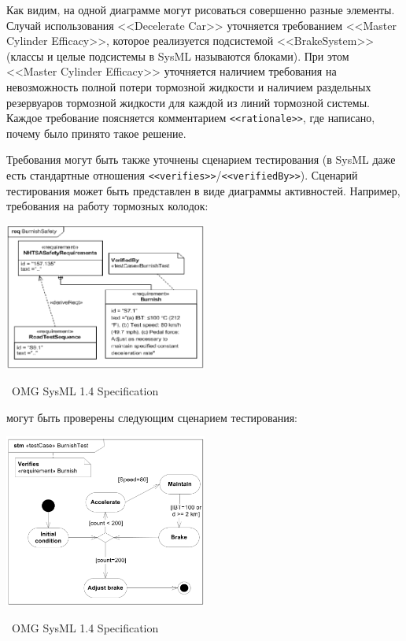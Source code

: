 \documentclass[a5paper]{article}
\newcommand{\attribution}[1] {
    \vspace{-4mm}\begin{flushright}\begin{scriptsize}%
    {\textcopyright\, #1}\end{scriptsize}\end{flushright}
}
\begin{document}
Как видим, на одной диаграмме могут рисоваться совершенно разные элементы. Случай использования <<Decelerate Car>> уточняется требованием <<Master Cylinder Efficacy>>, которое реализуется подсистемой <<BrakeSystem>> (классы и целые подсистемы в SysML называются блоками). При этом <<Master Cylinder Efficacy>> уточняется наличием требования на невозможность полной потери тормозной жидкости и наличием раздельных резервуаров тормозной жидкости для каждой из линий тормозной системы. Каждое требование поясняется комментарием \verb|<<rationale>>|, где написано, почему было принято такое решение.

Требования могут быть также уточнены сценарием тестирования (в SysML даже есть стандартные отношения \verb|<<verifies>>|/\verb|<<verifiedBy>>|). Сценарий тестирования может быть представлен в виде диаграммы активностей. Например, требования на работу тормозных колодок:

\begin{center}
    \includegraphics[width=0.5\textwidth]{sysMlRequirementsTest.png}
    \attribution{OMG SysML 1.4 Specification}
\end{center}

могут быть проверены следующим сценарием тестирования:

\begin{center}
    \includegraphics[width=0.5\textwidth]{sysMlRequirementsTestActivity.png}
    \attribution{OMG SysML 1.4 Specification}
\end{center}
\end{document}
